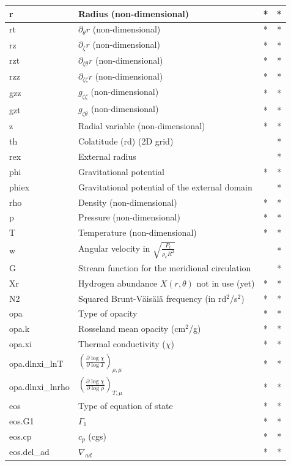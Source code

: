 \begin{longtable}{|l|p{8cm}|c|c|}
\hline
r&Radius (non-dimensional) &*&*\\
\hline
rt& $\partial_\theta r$ (non-dimensional) &*&*\\
\hline
rz& $\partial_\zeta r$ (non-dimensional) &*&*\\
\hline
rzt& $\partial_{\zeta\theta} r$ (non-dimensional) &*&*\\
\hline
rzz& $\partial_{\zeta\zeta} r$ (non-dimensional) &*&*\\
\hline
gzz& $g_{\zeta\zeta}$ (non-dimensional) &*&*\\
\hline
gzt& $g_{\zeta\theta}$ (non-dimensional) &*&*\\
\hline
z&Radial variable (non-dimensional)&*&*\\
\hline
th&Colatitude (rd) (2D grid) &&*\\
\hline
rex&External radius&&*\\
\hline
phi&Gravitational potential&*&*\\
\hline
phiex&Gravitational potential of the external domain&&*\\
\hline
rho&Density (non-dimensional)&*&*\\
\hline
p&Pressure (non-dimensional)&*&*\\
\hline
T&Temperature (non-dimensional)&*&*\\
\hline
w&Angular velocity in $\sqrt{\frac{P_c}{\rho_cR^2}}$&&*\\
\hline
G&Stream function for the meridional circulation&&*\\
\hline
Xr&Hydrogen abundance $X(r,\theta)$ not in use (yet) &*&*\\
\hline
N2&Squared Brunt-V\"ais\"al\"a frequency (in rd$^2$/s$^2$)&*&*\\
\hline
opa&Type of opacity&*&*\\
\hline
opa.k&Rosseland mean opacity (cm$^2$/g) &*&*\\
\hline
opa.xi&Thermal conductivity ($\chi$)&*&*\\
\hline
opa.dlnxi\_lnT&$\left(\frac{\partial\log\chi}{\partial\log T}\right)_{\rho,\mu}$&*&*\\
\hline
opa.dlnxi\_lnrho&$\left(\frac{\partial\log\chi}{\partial\log\rho}\right)_{T,\mu}$&*&*\\
\hline
eos&Type of equation of state&*&*\\
\hline
eos.G1&$\Gamma_1$&*&*\\
\hline
eos.cp&$c_p$ (cgs) &*&*\\
\hline
eos.del\_ad&$\nabla_{ad}$&*&*\\

\end{longtable}
